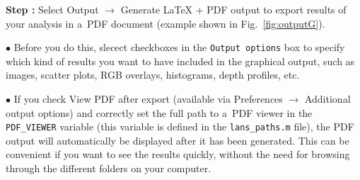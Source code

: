 \documentclass[a4paper, 11pt]{article}
\newcommand{\ttt}[1]{\texttt{#1}}
\newcommand{\lans}[1]{{\color{magenta}#1}}
\newcommand{\lanscb}[1]{{\color{darkgreen}#1}}
\newcommand\ra{\rightarrow}
\newcounter{step}
\newcommand\s{\addtocounter{step}{1}\vskip5pt\noindent\textbf{Step \thestep:}{ }}
\newcommand\bul{\vskip5pt\noindent$\bullet${ }}
\begin{document}
\s Select \lans{Output} $\ra$ \lans{Generate LaTeX + PDF output} to export results of your analysis in a~PDF document (example shown in Fig.~\ref{fig:outputG}). 

\bul Before you do this, slecect checkboxes in the \ttt{Output options} box to specify which kind of results you want to have included in the graphical output, such as  \lanscb{images}, \lanscb{scatter plots}, \lanscb{RGB overlays}, \lanscb{histograms}, \lanscb{depth profiles}, etc.

\bul If you check \lanscb{View PDF after export} (available via \lans{Preferences} $\ra$ \lans{Additional output options}) and correctly set the full path to a~PDF viewer in the \ttt{PDF\_VIEWER} variable (this variable is defined in the \ttt{lans\_paths.m} file), the PDF output will automatically be displayed after it has been generated. This can be convenient if you want to see the results quickly, without the need for browsing through the different folders on your computer.
\end{document}
